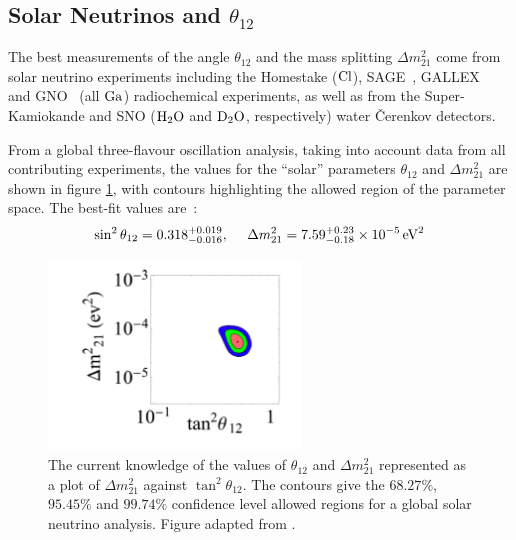 \subsection{Solar Neutrinos and $\theta_{12}$}
The best measurements of the angle $\theta_{12}$ and the mass splitting $\Delta m^2_{21}$ come from solar neutrino experiments including the Homestake ($\mathrm{Cl}$), SAGE~\citep{SAGE2002}, GALLEX~\citep{GALLEX1999} and GNO~\citep{GNO2005} (all $\mathrm{Ga}$) radiochemical experiments, as well as from the Super-Kamiokande and SNO ($\mathrm{H}_2\mathrm{O}$ and $\mathrm{D}_2\mathrm{O}$, respectively) water Čerenkov detectors.

From a global three-flavour oscillation analysis, taking into account data from all contributing experiments, the values for the ``solar'' parameters $\theta_{12}$ and $\Delta m^2_{21}$ are shown in figure \ref{fig:theta_12_confidence}, with contours highlighting the allowed region of the parameter space. The best-fit values are~\citep{Mezzetto2010}:
\begin{equation}\label{eqn:solar_parameters}
\sin^2 \theta_{12} = 0.318^{+0.019}_{-0.016} , ~~~~ \Delta m^2_{21} =  7.59^{+0.23}_{-0.18} \times 10^{-5} \,\mathrm{eV}^2
\end{equation}

\begin{figure}
\centering
\includegraphics[width=0.6\textwidth]{chapters/neutrinophysics_images/theta_12}
\caption[Allowed region for $\theta_{12}$ and $\Delta m^2_{21}$]{\label{fig:theta_12_confidence}The current knowledge of the values of $\theta_{12}$ and $\Delta m^2_{21}$ represented as a plot of $\Delta m^2_{21}$ against $\tan^2\theta_{12}$. The contours give the $68.27\%$, $95.45\%$ and $99.74\%$ confidence level allowed regions for a global solar neutrino analysis. Figure adapted from \citep{Bellini2012}.}
\end{figure}

